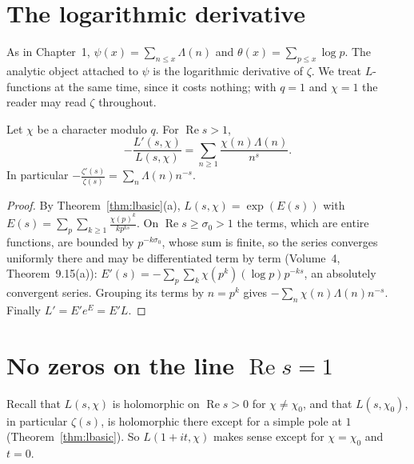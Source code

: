 \section{The logarithmic derivative}

As in Chapter~1, $\psi(x)=\sum_{n\le x}\Lambda(n)$ and $\theta(x)=\sum_{p\le x}\log p$. The analytic object attached to $\psi$ is the logarithmic derivative of $\zeta$. We treat
$L$-functions at the same time, since it costs nothing; with $q=1$ and $\chi=1$ the reader may read $\zeta$ throughout.

\begin{lemma}\label{lem:logderiv}
Let $\chi$ be a character modulo $q$. For $\operatorname{Re}s>1$,
\[
-\frac{L'(s,\chi)}{L(s,\chi)}=\sum_{n\ge1}\frac{\chi(n)\Lambda(n)}{n^s}.
\]
In particular $-\frac{\zeta'(s)}{\zeta(s)}=\sum_n\Lambda(n)n^{-s}$.
\end{lemma}
\begin{proof}
By Theorem~\ref{thm:lbasic}(a), $L(s,\chi)=\exp(E(s))$ with $E(s)=\sum_p\sum_{k\ge1}\frac{\chi(p)^k}{kp^{ks}}$. On $\operatorname{Re}s\ge\sigma_0>1$ the terms, which are entire functions, are
bounded by $p^{-k\sigma_0}$, whose sum is finite, so the series converges uniformly there and may be differentiated term by term (Volume~4, Theorem~9.15(a)):
$E'(s)=-\sum_p\sum_k\chi(p^k)(\log p)p^{-ks}$, an absolutely convergent series. Grouping its terms by $n=p^k$ gives $-\sum_n\chi(n)\Lambda(n)n^{-s}$. Finally
$L'=E'e^E=E'L$.
\end{proof}

\section{No zeros on the line \texorpdfstring{$\operatorname{Re}s=1$}{Re s = 1}}

Recall that $L(s,\chi)$ is holomorphic on $\operatorname{Re}s>0$ for $\chi\ne\chi_0$, and that $L(s,\chi_0)$, in particular $\zeta(s)$, is holomorphic there except for a simple pole at $1$
(Theorem~\ref{thm:lbasic}). So $L(1+it,\chi)$ makes sense except for $\chi=\chi_0$ and $t=0$.

